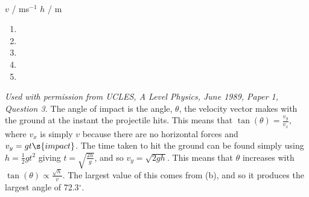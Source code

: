 
\begin{problem}[A1989PIQ3l] 
{ \\

\quad\quad\quad $v$ / ms$^{-1}$ \quad\quad $h$ / m
\begin{enumerate}
	\item {}
	\item {}\correct
	\item {}
	\item {}
	\item {}
\end{enumerate}
}
{\textit{Used with permission from UCLES, A Level Physics, June 1989, Paper 1, Question 3.}}
{ The angle of impact is the angle, $\theta$, the velocity vector makes with the ground at the instant the projectile hits. This means that $\tan(\theta) = \frac{v_{y}}{v_{x}}$, where $v_{x}$ is simply $v$ because there are no horizontal forces and $v_{y} = gt\s{impact}$. The time taken to hit the ground can be found simply using $h = \frac{1}{2}gt^{2}$ giving $t = \sqrt{\frac{2h}{g}}$, and so $v_{y} = \sqrt{2gh}$. This means that $\theta$ increases with $\tan(\theta) \propto \frac{\sqrt{h}}{v}$. The largest value of this comes from (b), and so it produces the largest angle of 72.3$^{\circ}$.
}
\end{problem}